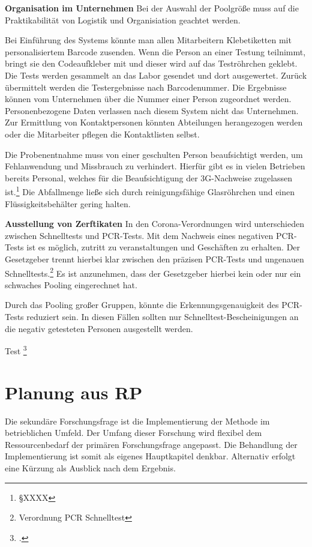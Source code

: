 \cleardoublepage

\textbf{Organisation im Unternehmen}\newline
Bei der Auswahl der Poolgröße muss auf die Praktikabilität von Logistik und Organisiation geachtet werden.

Bei Einführung des Systems könnte man allen Mitarbeitern Klebetiketten mit personalisiertem Barcode zusenden.
Wenn die Person an einer Testung teilnimmt, bringt sie den Codeaufkleber mit und dieser wird auf das Teströhrchen geklebt.
Die Tests werden gesammelt an das Labor gesendet und dort ausgewertet.
Zurück übermittelt werden die Testergebnisse nach Barcodenummer.
Die Ergebnisse können vom Unternehmen über die Nummer einer Person zugeordnet werden.
Personenbezogene Daten verlassen nach diesem System nicht das Unternehmen.
Zur Ermittlung von Kontaktpersonen könnten Abteilungen herangezogen werden oder die Mitarbeiter pflegen die Kontaktlisten selbst.

Die Probenentnahme muss von einer geschulten Person beaufsichtigt werden, um Fehlanwendung und Missbrauch zu verhindert.
Hierfür gibt es in vielen Betrieben bereits Personal, welches für die Beaufsichtigung der 3G-Nachweise zugelassen ist.\footnote{§XXXX}
Die Abfallmenge ließe sich durch reinigungsfähige Glasröhrchen und einen Flüssigkeitsbehälter gering halten.

\textbf{Ausstellung von Zerftikaten}\newline
In den Corona-Verordnungen wird unterschieden zwischen Schnelltests und PCR-Tests.
Mit dem Nachweis eines negativen PCR-Tests ist es möglich, zutritt zu veranstaltungen und Geschäften zu erhalten.
Der Gesetzgeber trennt hierbei klar zwischen den präzisen PCR-Tests und ungenauen Schnelltests.\footnote{Verordnung PCR Schnelltest}
Es ist anzunehmen, dass der Gesetzgeber hierbei kein oder nur ein schwaches Pooling eingerechnet hat.

Durch das Pooling großer Gruppen, könnte die Erkennungsgenauigkeit des PCR-Tests reduziert sein.
In diesen Fällen sollten nur Schnelltest-Bescheinigungen an die negativ getesteten Personen ausgestellt werden.


Test
\footcite{TD15}
\cleardoublepage




\section{Planung aus RP}
Die sekundäre Forschungsfrage ist die Implementierung der Methode im betrieblichen Umfeld.
Der Umfang dieser Forschung wird flexibel dem Ressourcenbedarf der primären Forschungsfrage angepasst.
Die Behandlung der Implementierung ist somit als eigenes Hauptkapitel denkbar.
Alternativ erfolgt eine Kürzung als Ausblick nach dem Ergebnis.

